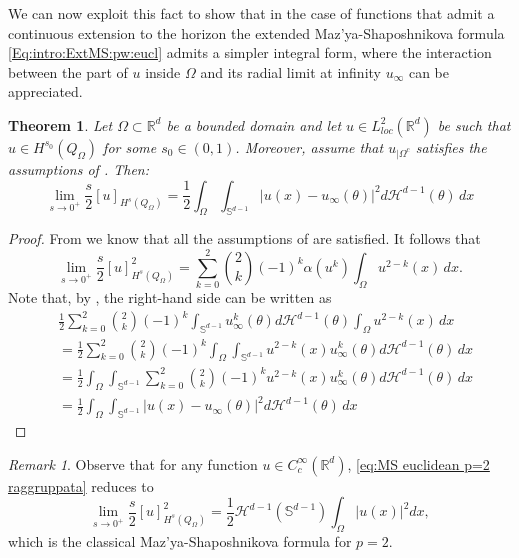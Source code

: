 \documentclass[reqno,11pt]{amsart}
\numberwithin{equation}{section}
\theoremstyle{definition} %
\theoremstyle{plain}
\newtheorem{theo}[theo]{Theorem}  %
\theoremstyle{definition}
\theoremstyle{remark}
\newtheorem{remark}[remark]{Remark}
\def\Sd{{\mathbb{S}^{d-1}}}
\def\Haus{{\mathcal{H}^{d-1}}}
\def\Qom{{Q_\Omega}}
\def\O{\Omega}
\def\io{\int_\Omega}
\def\R{\mathbb{R}}
\newcommand{\abs}[1]{\left|#1\right|}
\begin{document}
We can now exploit this fact to show that in the case of functions that admit a continuous extension to the horizon the extended Maz'ya-Shaposhnikova formula \eqref{Eq:intro:ExtMS:pw:eucl} admits a simpler integral form, where the interaction between the part of $u$ inside $\Omega$ and its radial limit at infinity $u_\infty$ can be appreciated.

\begin{theo}\label{Theo:MS:integrale doppio}
     Let $\Omega\subset\R^d$ be a bounded domain and let $u\in L^2_{loc}(\R^d)$ be such that $u\in H^{s_0}(\Qom)$ for some ${s_0\in(0,1)}$. Moreover, assume that $u_{\mid\O^c}$ satisfies the assumptions of . Then:
    \begin{equation}\label{eq:MS euclidean p=2 raggruppata}
        \lim_{s\to0^+}\frac{s}{2}[u]_{H^s(Q_\O)}=\frac12\int_\O\int_{\Sd}|u(x)-u_\infty (\theta)|^2d\Haus(\theta)\,dx
    \end{equation}
\end{theo}
\begin{proof}
    From  we know that all the assumptions of  are satisfied. It follows that
    \[
        \lim_{s\to 0^+}\frac{s}{2}[u]^2_{H^s(\Qom)}=\sum_{k=0}^{2}\binom{2}{k}(-1)^k\alpha(u^k)\int_\Omega u^{2-k}(x)\,dx.
    \]
    Note that, by , the right-hand side can be written as
    \begin{equation}\begin{split}
    &\frac12\sum_{k=0}^{2}\binom{2}{k}(-1)^k\int_\Sd u_\infty^k(\theta)d\Haus(\theta)\int_\Omega u^{2-k}(x)\,dx\\
    &=\frac12\sum_{k=0}^{2}\binom{2}{k}(-1)^k\io\int_\Sd u^{2-k}(x)u_\infty^k(\theta)d\Haus(\theta)\,dx\\
    &=\frac12\io\int_\Sd\sum_{k=0}^{2}\binom{2}{k}(-1)^k u^{2-k}(x)u_\infty^k(\theta)d\Haus(\theta)\,dx\\
    &=\frac12\io\int_\Sd\abs{u(x)-
    u_\infty(\theta)
    }^2d\Haus(\theta)\,dx
    \end{split}
    \end{equation}
\end{proof}
\begin{remark}
    Observe that for any function $u\in C^\infty_c(\R^d)$, \eqref{eq:MS euclidean p=2 raggruppata} reduces to
    \begin{equation}
        \lim_{s\to0^+}\frac{s}{2}[u]_{H^s(\Qom)}^2=\frac{1}2\Haus(\Sd)\io|u(x)|^2dx,
    \end{equation}
    which is the classical Maz'ya-Shaposhnikova formula for $p=2$.
\end{remark}
\end{document}
